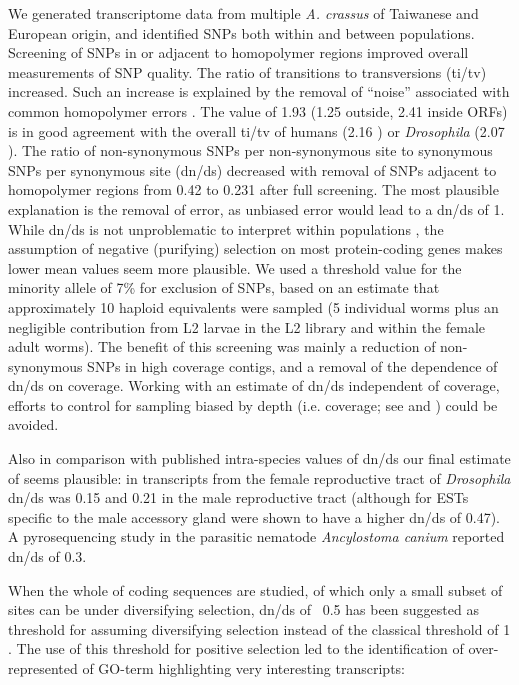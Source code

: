 We generated transcriptome data from multiple \textit{A. crassus} of
Taiwanese and European origin, and identified SNPs both within and
between populations. Screening of SNPs in or adjacent to homopolymer
regions improved overall measurements of SNP quality. The ratio of
transitions to transversions (ti/tv) increased. Such an increase is
explained by the removal of ``noise'' associated with common homopolymer
errors \cite{pmid21685085}. The value of 1.93 (1.25 outside, 2.41
inside ORFs) is in good agreement with the overall ti/tv of humans
(2.16 \cite{pmid21169219}) or \textit{Drosophila} (2.07
\cite{pmid21143862}). The ratio of non-synonymous SNPs per
non-synonymous site to synonymous SNPs per synonymous site (dn/ds)
decreased with removal of SNPs adjacent to homopolymer regions from
0.42 to 0.231 after full screening. The most plausible explanation is
the removal of error, as unbiased error would lead to a dn/ds of
1. While dn/ds is not unproblematic to interpret within populations
\cite{pmid19081788}, the assumption of negative (purifying) selection
on most protein-coding genes makes lower mean values seem more
plausible. We used a threshold value for the minority allele of 7\%
for exclusion of SNPs, based on an estimate that approximately 10
haploid equivalents were sampled (5 individual worms plus an
negligible contribution from L2 larvae in the L2 library and within
the female adult worms). The benefit of this screening was mainly a
reduction of non-synonymous SNPs in high coverage contigs, and a
removal of the dependence of dn/ds on coverage. Working with an
estimate of dn/ds independent of coverage, efforts to control for
sampling biased by depth (i.e. coverage; see \cite{pmid18590545} and
\cite{pmid20478048}) could be avoided.

Also in comparison with published intra-species values of dn/ds our
final estimate of seems plausible: in transcripts from the female
reproductive tract of \textit{Drosophila} dn/ds was 0.15
\cite{pmid15579698} and 0.21 in the male reproductive tract
\cite{pmid11404480} (although for ESTs specific to the male accessory
gland were shown to have a higher dn/ds of 0.47). A pyrosequencing
study in the parasitic nematode \textit{Ancylostoma canium}
\cite{pmid20470405} reported dn/ds of 0.3.

When the whole of coding sequences are studied, of which only a small
subset of sites can be under diversifying selection, dn/ds of ~0.5 has
been suggested as threshold for assuming diversifying selection
\cite{pmid15579698} instead of the classical threshold of 1
\cite{pmid6449605}. The use of this threshold for positive selection
led to the identification of over-represented of GO-term highlighting
very interesting transcripts:

